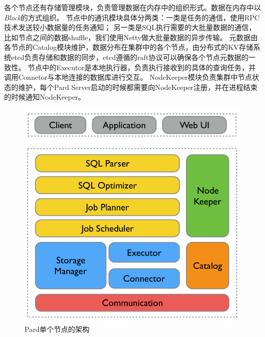 \documentclass[a4paper, 12pt]{ctexart}
\begin{document}
各个节点还有存储管理模块，负责管理数据在内存中的组织形式。数据在内存中以\textit{Block}的方式组织。
节点中的通讯模块具体分两类：一类是任务的通信，使用RPC技术发送较小数据量的任务通知；
另一类是SQL执行需要的大批量数据的通信，比如节点之间的数据shuffle，我们使用Netty做大批量数据的异步传输。
元数据由各节点的Catalog模块维护，数据分布在集群中的各个节点，由分布式的KV存储系统etcd负责存储和数据的同步，etcd遵循的raft协议可以确保各个节点元数据的一致性。
节点中的Executor是本地执行器，负责执行接收到的具体的查询任务，并调用Connetor与本地连接的数据库进行交互。
NodeKeeper模块负责集群中节点状态的维护，每个Pard Server启动的时候都需要向NodeKeeper注册，并在进程结束的时候通知NodeKeeper。

\begin{figure}[htbp]
	\centering
	\includegraphics[width=0.7\linewidth]{figure/pard-node-in.png}
	\caption{Pard单个节点的架构}
	\label{fig:node1}
\end{figure}
\end{document}
